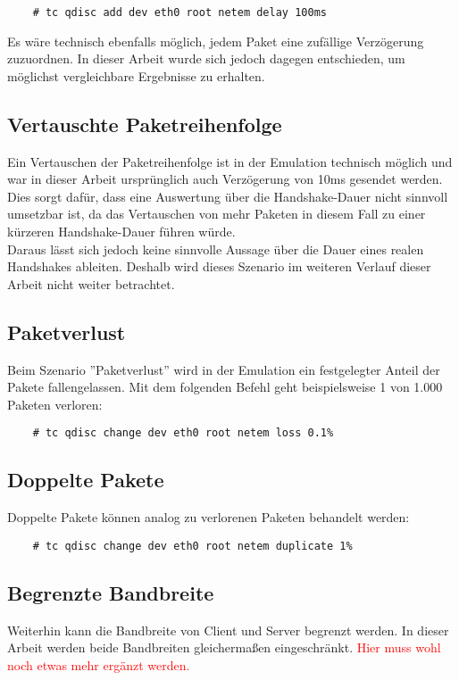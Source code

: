 		\begin{lstlisting}
	# tc qdisc add dev eth0 root netem delay 100ms
		\end{lstlisting}
		
		Es wäre technisch ebenfalls möglich, jedem Paket eine zufällige Verzögerung zuzuordnen. In dieser Arbeit wurde sich jedoch 				dagegen entschieden, um möglichst vergleichbare Ergebnisse zu erhalten.	
		
		\subsection{Vertauschte Paketreihenfolge}
		\label{subsec:methodik:szenarien:reihenfolge}
		
		Ein Vertauschen der Paketreihenfolge ist in der Emulation technisch möglich und war in dieser Arbeit ursprünglich auch 				Verzögerung von 10ms gesendet werden. Dies sorgt dafür, dass eine Auswertung über die Handshake-Dauer nicht sinnvoll umsetzbar 		ist, da das Vertauschen von mehr Paketen in diesem Fall zu einer kürzeren Handshake-Dauer führen würde.\\
		
		Daraus lässt sich jedoch keine sinnvolle Aussage über die Dauer eines realen Handshakes ableiten. Deshalb wird dieses Szenario 		im weiteren Verlauf dieser Arbeit nicht weiter betrachtet.
		
		\subsection{Paketverlust}
		\label{subsec:methodik:szenarien:verlust}
		
		Beim Szenario ''Paketverlust'' wird in der Emulation ein festgelegter Anteil der Pakete fallengelassen. Mit dem folgenden 				Befehl geht beispielsweise 1 von 1.000 Paketen verloren:\\
		
		\begin{lstlisting}
	# tc qdisc change dev eth0 root netem loss 0.1%
		\end{lstlisting}
		
		\subsection{Doppelte Pakete}
		\label{subsec:methodik:szenarien:doppelt}
		
		Doppelte Pakete können analog zu verlorenen Paketen behandelt werden: \\
		
		\begin{lstlisting}
	# tc qdisc change dev eth0 root netem duplicate 1%
		\end{lstlisting}
		
		\subsection{Begrenzte Bandbreite}
		\label{subsec:methodik:szenarien:bandbreite}
		
		Weiterhin kann die Bandbreite von Client und Server begrenzt werden. In dieser Arbeit werden beide Bandbreiten gleichermaßen 			eingeschränkt. \textcolor{red}{Hier muss wohl noch etwas mehr ergänzt werden.}
